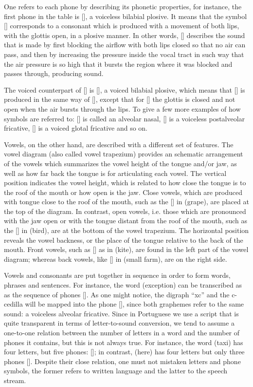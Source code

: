 One refers to each phone by describing its phonetic properties, for instance, the first phone in the table is [], a voiceless bilabial plosive. It means that the symbol [] corresponds to a consonant which is produced with a movement of both lips, with the glottis open, in a plosive manner. In other words, [] describes the sound that is made by first blocking the airflow with both lips closed so that no air can pass, and then by increasing the pressure inside the vocal tract in such way that the air pressure is so high that it bursts the region where it was blocked and passes through, producing sound.

The voiced counterpart of [] is [], a voiced bilabial plosive, which means that [] is produced in the same way of [], except that for [] the glottis is closed and not open when the air bursts through the lips. To give a few more examples of how symbols are referred to: [] is called an alveolar nasal, [] is a voiceless postalveolar fricative, [] is a voiced glotal fricative and so on.

Vowels, on the other hand, are described with a different set of features. The vowel diagram (also called vowel trapezium) provides an schematic arrangement of the vowels which summarizes the vowel height of the tongue and/or jaw, as well as how far back the tongue is for articulating each vowel. The vertical position indicates the vowel height, which is related to how close the tongue is to the roof of the mouth or how open is the jaw. Close vowels, which are produced with tongue close to the roof of the mouth, such as the [] in  (grape), are placed at the top of the diagram. In contrast, open vowels, i.e. those which are pronounced with the jaw open or with the tongue distant from the roof of the mouth, such as the [] in  (bird), are at the bottom of the vowel trapezium. The horizontal position reveals the vowel backness, or the place of the tongue relative to the back of the mouth. Front vowels, such as [] as in  (kite), are found in the left part of the vowel diagram; whereas back vowels, like [] in  (small farm), are on the right side.

Vowels and consonants are put together in sequence in order to form words, phrases and sentences. For instance, the word  (exception) can be transcribed as as the sequence of phones []. As one might notice, the digraph ``xc'' and the c-cedilla will be mapped into the phone [], since both graphemes refer to the same sound: a voiceless alveolar fricative. Since in Portuguese we use a script that is quite transparent in terms of letter-to-sound conversion, we tend to assume a one-to-one relation between the number of letters in a word and the number of phones it contains, but this is not always true. For instance, the word  (taxi) has four letters, but five phones: []; in contrast,  (here) has four letters but only three phones []. Despite their close relation, one must not mistaken letters and phone symbols, the former refers to written language and the latter to the speech stream.

